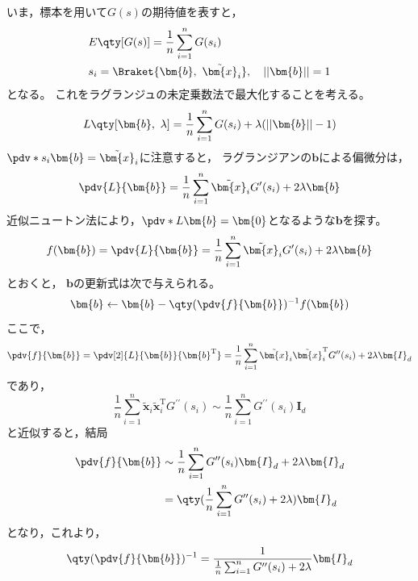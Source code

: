 \documentclass[class=jsarticle, crop=false, dvipdfmx, fleqn]{standalone}
\begin{document}
いま，標本を用いて\(G(s)\)の期待値を表すと，
\begin{align}
    & E\qty[G(s)] = \frac{1}{n} \sum_{i=1}^{n} G(s_i) \\
    & s_i = \Braket{\bm{b},\ \tilde{\bm{x}}_i}, \quad ||\bm{b}|| = 1
\end{align}
となる。
これをラグランジュの未定乗数法で最大化することを考える。
\begin{equation}
    L\qty[\bm{b},\ \lambda] = \frac{1}{n} \sum_{i=1}^{n} G(s_i) + \lambda (||\bm{b}|| - 1)
\end{equation}
\(\pdv*{s_i}{\bm{b}} = \tilde{\bm{x}}_i\)に注意すると，
ラグランジアンの\(\bm{b}\)による偏微分は，
\begin{equation}
    \pdv{L}{\bm{b}} = \frac{1}{n} \sum_{i=1}^{n} \tilde{\bm{x}}_i G^\prime (s_i) + 2 \lambda\bm{b}
\end{equation}
近似ニュートン法により，\(\pdv*{L}{\bm{b}} = \bm{0}\)となるような\(\bm{b}\)を探す。
\begin{equation}
    f(\bm{b}) = \pdv{L}{\bm{b}} = \frac{1}{n} \sum_{i=1}^{n} \tilde{\bm{x}}_i G^\prime (s_i) + 2 \lambda\bm{b}
\end{equation}
とおくと，
\(\bm{b}\)の更新式は次で与えられる。
\begin{equation}
    \bm{b} \leftarrow \bm{b} - \qty(\pdv{f}{\bm{b}})^{-1} f(\bm{b})
\end{equation}
ここで，
\begin{equation}
    \pdv{f}{\bm{b}}
        = \pdv[2]{L}{\bm{b}}{\bm{b}^\mathrm{T}}
        = \frac{1}{n} \sum_{i=1}^{n} \tilde{\bm{x}}_i \tilde{\bm{x}}_i^\mathrm{T} G^{\prime\prime} (s_i) + 2 \lambda\bm{I}_d
\end{equation}
であり，
\begin{equation}
    \frac{1}{n} \sum_{i=1}^{n} \tilde{\bm{x}}_i \tilde{\bm{x}}_i^\mathrm{T} G^{\prime\prime} (s_i)
        \sim \frac{1}{n} \sum_{i=1}^{n} G^{\prime\prime} (s_i) \bm{I}_d
\end{equation}
と近似すると，結局
\begin{align}
    \pdv{f}{\bm{b}}
        & \sim \frac{1}{n} \sum_{i=1}^{n} G^{\prime\prime} (s_i) \bm{I}_d + 2\lambda\bm{I}_d \\
        & = \qty(\frac{1}{n} \sum_{i=1}^{n} G^{\prime\prime} (s_i) + 2\lambda) \bm{I}_d \\
\end{align}
となり，これより，
\begin{equation}
    \qty(\pdv{f}{\bm{b}})^{-1} = \frac{1}{\frac{1}{n} \sum_{i=1}^{n} G^{\prime\prime} (s_i) + 2\lambda} \bm{I}_d
\end{equation}
\end{document}
